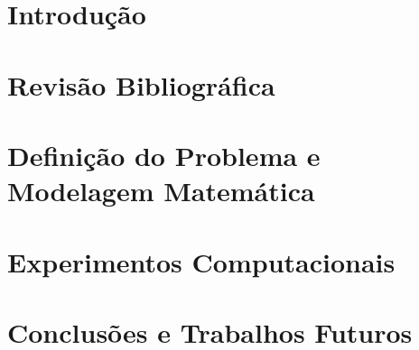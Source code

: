 \documentclass [mestrado, pre-defesa]{packages/icmc}
\begin{document}
\textual

\chapter{Introdução}
\label{chapter:introducao}


\chapter{Revisão Bibliográfica}
\label{chapter:rev_bib}


\chapter{Definição do Problema e Modelagem Matemática}
\label{chapter:def_prob_mod}


%

\chapter{Experimentos Computacionais}
\label{chapter:exp_comp}


\chapter{Conclusões e Trabalhos Futuros}
\label{chapter:conc}


% 

% 


% 
\end{document}
